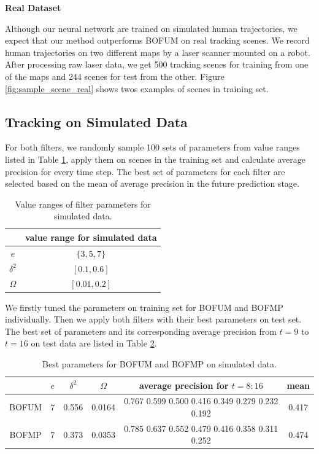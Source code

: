 \textbf{Real Dataset}

Although our neural network are trained on simulated human trajectories, we expect that our method outperforms BOFUM on real tracking scenes. We record human trajectories on two different maps by a laser scanner mounted on a robot. After processing raw laser data, we get 500 tracking scenes for training from one of the maps and 244 scenes for test from the other. Figure \ref{fig:sample_scene_real} shows twos examples of scenes in training set.

\subsection{Tracking on Simulated Data}

For both filters, we randomly sample 100 sets of parameters from value ranges listed in Table \ref{table:param_range_simulated}, apply them on scenes in the training set and calculate average precision for every time step. The best set of parameters for each filter are selected based on the mean of average precision in the future prediction stage. 

\begin{table}[H]
\centering
  \begin{tabular}{c|c}
    \hline
     &   value range for simulated data \\ \hline
    \( e \) & \( \{3, 5, 7\} \) \\
    \(  \delta^2\) & \( [0.1, 0.6]\) \\   
   \( \Omega \) & \( [0.01, 0.2] \) \\
   \hline
 \end{tabular}
\caption{Value ranges of filter parameters for simulated data.}
\label{table:param_range_simulated}
\end{table}

 We firstly tuned the parameters on training set for BOFUM and BOFMP individually. Then we apply both filters with their best parameters on test set. The best set of parameters and its corresponding average precision from \( t=9 \) to \( t=16 \) on test data are listed in Table \ref{table:best_param_simulated}. 

\begin{table}[H]
\centering  
\begin{tabularx}{\textwidth}{c|c|c|c|c|c}
    \hline
    & $ e $ & $ \delta^2 $ & $ \Omega $ & average precision for $t=8:16 $ & mean\\ \hline
    BOFUM & 7 & 0.556 & 0.0164 &  0.767  0.599  0.500    0.416  0.349  0.279  0.232  0.192 & 0.417 \\
    BOFMP & 7 & 0.373 & 0.0353 & 0.785  0.637  0.552  0.479  0.416  0.358  0.311  0.252 & 0.474 \\
   \hline
  \end{tabularx}
\caption{Best parameters for BOFUM and BOFMP on simulated data.}
\label{table:best_param_simulated}
\end{table}

